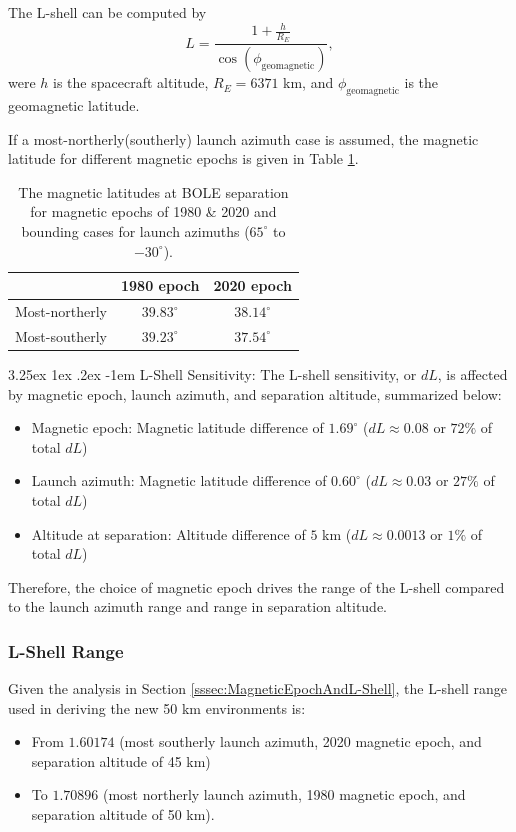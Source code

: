 \documentclass{hitec}
\makeatletter
\renewcommand\paragraph{\@startsection{paragraph}{5}{\z@}%
	{3.25ex \@plus1ex \@minus.2ex}%
	{-1em}%
	{\normalfont\normalsize\bfseries}}
\makeatother
\begin{document}
The L-shell can be computed by
\begin{equation}
	L = \frac{1 + \frac{h}{R_E}}{\cos(\phi_{\text{geomagnetic}})},
\end{equation}
were $h$ is the spacecraft altitude, $R_E = 6371$ km, and $\phi_{\text{geomagnetic}}$ is the geomagnetic latitude.

If a most-northerly(southerly) launch azimuth case is assumed, the magnetic latitude for different magnetic epochs is given in Table \ref{tab:magnetic_lat_ranges}.
\begin{table}[h]\centering
	\caption{The magnetic latitudes at BOLE separation for magnetic epochs of 1980 \& 2020 and bounding cases for launch azimuths ($65^\circ$ to $-30^\circ$).}\label{tab:magnetic_lat_ranges}
	\begin{tabular}{|c | c | c |}\hline
		 & 1980 epoch & 2020 epoch  \\\hline
		Most-northerly & $39.83^\circ$ & $38.14^\circ$ \\\hline
		Most-southerly & $39.23^\circ$ & $37.54^\circ$ \\\hline
	\end{tabular}
\end{table}

\paragraph{L-Shell Sensitivity:}
The L-shell sensitivity, or $dL$, is affected by magnetic epoch, launch azimuth, and separation altitude, summarized below:
\begin{itemize}
	\item Magnetic epoch: Magnetic latitude difference of $1.69^\circ$ ($dL \approx 0.08$ or $72\%$ of total $dL$)
	\item Launch azimuth: Magnetic latitude difference of $0.60^\circ$ ($dL \approx 0.03$ or $27\%$ of total $dL$)
	\item Altitude at separation: Altitude difference of $5$ km ($dL \approx 0.0013$ or $1\%$ of total $dL$)
\end{itemize}
Therefore, the choice of magnetic epoch drives the range of the L-shell compared to the launch azimuth range and range in separation altitude.

\subsubsection{L-Shell Range}
Given the analysis in Section \ref{sssec:MagneticEpochAndL-Shell}, the L-shell range used in deriving the new 50 km environments is:
\begin{itemize}
	\item From $1.60174$ (most southerly launch azimuth, 2020 magnetic epoch, and separation altitude of 45 km)
	\item To $1.70896$ (most northerly launch azimuth, 1980 magnetic epoch, and separation altitude of 50 km).
\end{itemize}
\end{document}
